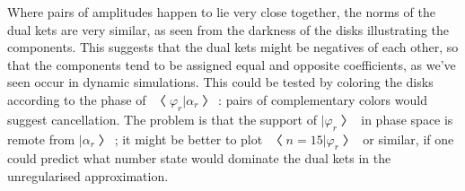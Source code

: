 Where pairs of amplitudes happen to lie very close together, the norms of the dual kets are very similar, as seen from the darkness of the disks illustrating the components.  This suggests that the dual kets might be negatives of each other, so that the components tend to be assigned equal and opposite coefficients, as we've seen occur in dynamic simulations.  This could be tested by coloring the disks according to the phase of $〈φ_r|α_r〉$: pairs of complementary colors would suggest cancellation.  The problem is that the support of $|φ_r〉$ in phase space is remote from $|α_r〉$; it might be better to plot $〈n=15|φ_r〉$ or similar, if one could predict what number state would dominate the dual kets in the unregularised approximation.

\bye